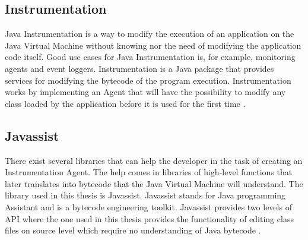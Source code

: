 \subsection{Instrumentation}
Java Instrumentation is a way to modify the execution of an application on the Java Virtual Machine without knowing nor the need of modifying the application code itself. Good use cases for Java Instrumentation is, for example, monitoring agents and event loggers. Instrumentation is a Java package that provides services for modifying the bytecode of the program execution. Instrumentation works by implementing an Agent that will have the possibility to modify any class loaded by the application before it is used for the first time \parencite{Java_Instrument}.


\subsection{Javassist}
There exist several libraries that can help the developer in the task of creating an Instrumentation Agent. The help comes in libraries of high-level functions that later translates into bytecode that the Java Virtual Machine will understand. The library used in this thesis is Javassist. Javassist stands for Java programming Assistant and is a bytecode engineering toolkit. Javassist provides two levels of API where the one used in this thesis provides the functionality of editing class files on source level which require no understanding of Java bytecode \parencite{Javassist}.
